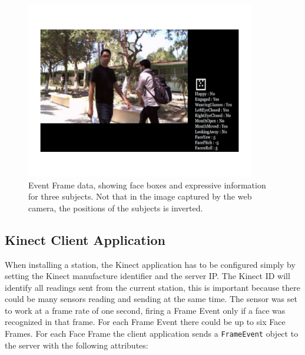 \documentclass[graybox]{svmult}
\begin{document}
\begin{figure}[b]
\centering 
\includegraphics[width=10cm]{img/face.pdf}

\caption{ Event Frame data, showing face boxes and expressive information for three subjects. Not that in the image captured by the web camera, the positions of the subjects is inverted.}
\label{fig:face}       %
\end{figure}

\subsection{Kinect Client Application}
\label{kinect}
When installing a station, the Kinect application has to be configured simply by setting the Kinect manufacture identifier and the server IP. The Kinect ID will identify all readings sent from the current station, this is important because there could be many sensors reading and sending at the same time. The sensor was set to work at a frame rate of one second, firing a Frame Event only if a face was recognized in that frame. For each Frame Event there could be up to six Face Frames. For each Face Frame the client application sends a \texttt{FrameEvent} object to the server with the following attributes:
\end{document}

